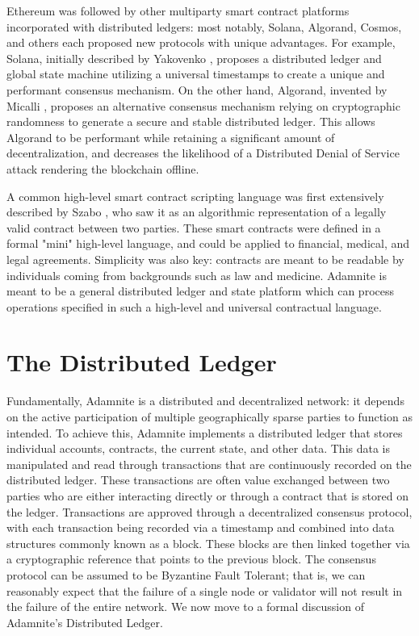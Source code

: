 \documentclass[conference]{IEEEtran}
\begin{document}
Ethereum was followed by other multiparty smart contract platforms incorporated with distributed ledgers: most notably, Solana, Algorand, Cosmos, and others each proposed new protocols with unique advantages. For example, Solana, initially described by Yakovenko \cite {Yakovenko}, proposes a distributed ledger and global state machine utilizing a universal timestamps to create a unique and performant consensus mechanism. On the other hand, Algorand, invented by
Micalli \cite{micalli2017Algroand}, proposes an alternative consensus mechanism relying on cryptographic randomness to generate a secure and stable distributed ledger. This allows Algorand to be performant while retaining a significant amount of decentralization, and decreases the likelihood of a Distributed Denial of Service attack rendering the blockchain offline.

A common high-level smart contract scripting language was first extensively described by Szabo \cite{szaboContract}, who saw it as an algorithmic representation of a legally valid contract between two parties. These smart contracts were defined in a formal "mini" high-level language, and could be applied to financial, medical, and legal agreements. Simplicity was also key: contracts are meant to be readable by individuals coming from backgrounds such as law and medicine. Adamnite is meant to be a general distributed ledger and state platform which can process operations specified in such a high-level and universal contractual language.


\section{The Distributed Ledger}
Fundamentally, Adamnite is a distributed and decentralized network: it depends on the active participation of multiple geographically sparse parties to function as intended. To achieve this, Adamnite implements a distributed ledger that stores individual accounts, contracts, the current state, and other data. This data is manipulated and read through transactions that are continuously recorded on the distributed ledger. These transactions are often value exchanged between two parties who are either interacting directly or through a contract that is stored on the ledger. Transactions are approved through a decentralized consensus protocol, with each transaction being recorded via a timestamp and combined into data structures commonly known as a block. These blocks are then linked together via a cryptographic reference that points to the previous block. The consensus protocol can be assumed to be Byzantine Fault Tolerant; that is, we can reasonably expect that the failure of a single node or validator will not result in the failure of the entire network. We now move to a formal discussion of Adamnite's Distributed Ledger.
\end{document}

